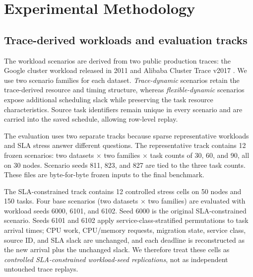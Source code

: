 \section{Experimental Methodology}
\label{sec:experimental}

\subsection{Trace-derived workloads and evaluation tracks}

The workload scenarios are derived from two public production traces: the Google cluster workload released in 2011 and Alibaba Cluster Trace v2017 \cite{reiss2012google,cheng2018alibaba,shahmirzadi2024analyzing}. We use two scenario families for each dataset. \emph{Trace-dynamic} scenarios retain the trace-derived resource and timing structure, whereas \emph{flexible-dynamic} scenarios expose additional scheduling slack while preserving the task resource characteristics. Source task identifiers remain unique in every scenario and are carried into the saved schedule, allowing row-level replay.

The evaluation uses two separate tracks because sparse representative workloads and SLA stress answer different questions. The representative track contains 12 frozen scenarios: two datasets $\times$ two families $\times$ task counts of 30, 60, and 90, all on 30 nodes. Scenario seeds 811, 823, and 827 are tied to the three task counts. These files are byte-for-byte frozen inputs to the final benchmark.

The SLA-constrained track contains 12 controlled stress cells on 50 nodes and 150 tasks. Four base scenarios (two datasets $\times$ two families) are evaluated with workload seeds 6000, 6101, and 6102. Seed 6000 is the original SLA-constrained scenario. Seeds 6101 and 6102 apply service-class-stratified permutations to task arrival times; CPU work, CPU/memory requests, migration state, service class, source ID, and SLA slack are unchanged, and each deadline is reconstructed as the new arrival plus the unchanged slack. We therefore treat these cells as \emph{controlled SLA-constrained workload-seed replications}, not as independent untouched trace replays.

